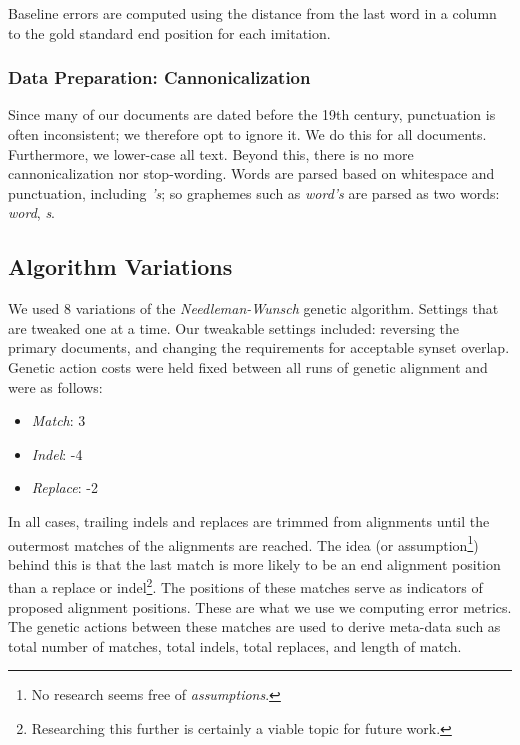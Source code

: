 
Baseline errors are computed using the distance from the last word in a column to the gold standard end position for each imitation.

\subsubsection{Data Preparation: Cannonicalization}
Since many of our documents are dated before the 19th century, punctuation is often inconsistent; we therefore opt to ignore it. We do this for all documents. Furthermore, we lower-case all text. Beyond this, there is no more cannonicalization nor stop-wording. Words are parsed based on whitespace and punctuation, including \textit{'s}; so graphemes such as \textit{word's} are parsed as two words: \textit{word}, \textit{s}. %

\subsection{Algorithm Variations}
We used 8 variations of the \textit{Needleman-Wunsch} genetic algorithm. Settings that are tweaked one at a time. Our tweakable settings included: reversing the primary documents, %
and changing the requirements for acceptable synset overlap. Genetic action costs were held fixed between all runs of genetic alignment and were as follows:

	\begin{itemize}
		\item \textit{Match}: 3
		\item \textit{Indel}: -4
		\item \textit{Replace}: -2
	\end{itemize}

In all cases, trailing indels and replaces are trimmed from alignments until the outermost matches of the alignments are reached. %
The idea (or assumption\footnote{No research seems free of \textit{assumptions}.}) behind this is that the last match is more likely to be an end alignment position than a replace or indel\footnote{Researching this further is certainly a viable topic for future work.}.
The positions of these matches serve as indicators of proposed alignment positions. These are what we use we computing error metrics. The genetic actions between these matches are used to derive meta-data such as total number of matches, total indels, total replaces, and length of match.

